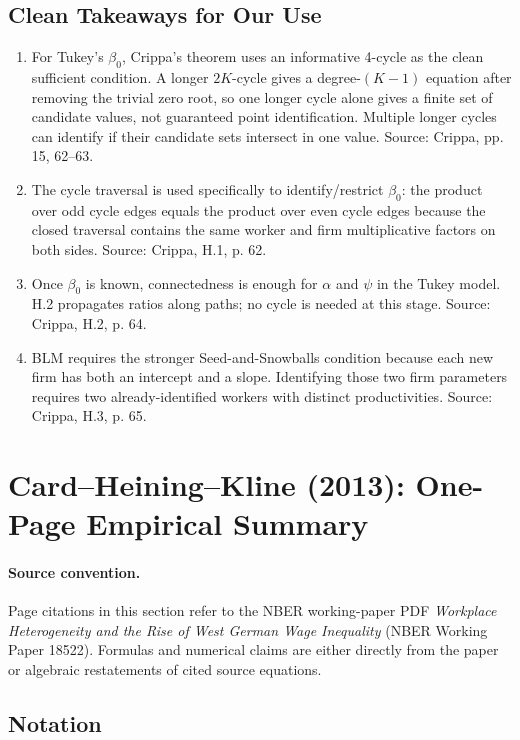 \documentclass[11pt]{article}
\begin{document}
\subsection{Clean Takeaways for Our Use}

\begin{enumerate}
\item For Tukey's $\beta_0$, Crippa's theorem uses an informative 4-cycle as the
clean sufficient condition. A longer $2K$-cycle gives a degree-$(K-1)$ equation
after removing the trivial zero root, so one longer cycle alone gives a finite set
of candidate values, not guaranteed point identification. Multiple longer cycles
can identify if their candidate sets intersect in one value. Source: Crippa,
pp. 15, 62--63.
\item The cycle traversal is used specifically to identify/restrict $\beta_0$:
the product over odd cycle edges equals the product over even cycle edges because
the closed traversal contains the same worker and firm multiplicative factors on
both sides. Source: Crippa, H.1, p. 62.
\item Once $\beta_0$ is known, connectedness is enough for $\alpha$ and $\psi$ in
the Tukey model. H.2 propagates ratios along paths; no cycle is needed at this
stage. Source: Crippa, H.2, p. 64.
\item BLM requires the stronger Seed-and-Snowballs condition because each new
firm has both an intercept and a slope. Identifying those two firm parameters
requires two already-identified workers with distinct productivities. Source:
Crippa, H.3, p. 65.
\end{enumerate}

\section{Card--Heining--Kline (2013): One-Page Empirical Summary}

\paragraph{Source convention.}
Page citations in this section refer to the NBER working-paper PDF
\emph{Workplace Heterogeneity and the Rise of West German Wage Inequality}
(NBER Working Paper 18522). Formulas and numerical claims are either directly
from the paper or algebraic restatements of cited source equations.

\subsection{Notation}
\end{document}
